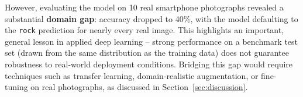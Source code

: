 \documentclass[11pt,a4paper]{article}
\begin{document}
However, evaluating the model on 10 real smartphone photographs revealed a substantial \textbf{domain gap}: accuracy dropped to 40\%, with the model defaulting to the \texttt{rock} prediction for nearly every real image. This highlights an important, general lesson in applied deep learning -- strong performance on a benchmark test set (drawn from the same distribution as the training data) does not guarantee robustness to real-world deployment conditions. Bridging this gap would require techniques such as transfer learning, domain-realistic augmentation, or fine-tuning on real photographs, as discussed in Section~\ref{sec:discussion}.
\end{document}
